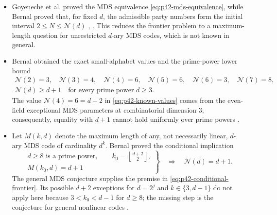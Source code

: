 \begin{itemize}
  \item Goyeneche et al. proved the MDS equivalence
  \eqref{eq:p42-mds-equivalence}, while Bernal proved that, for fixed $d$,
  the admissible party numbers form the initial interval
  $2\leq N\leq\mathcal N(d)$
  ,
  .  This reduces the frontier problem to a
  maximum-length question for unrestricted $d$-ary MDS codes, which is not
  known in general.

  \item Bernal obtained the exact small-alphabet values and the prime-power
  lower bound
  \begin{equation}
    \begin{gathered}
      \mathcal N(2)=3,\quad \mathcal N(3)=4,\quad \mathcal N(4)=6,
      \quad \mathcal N(5)=6,\quad \mathcal N(6)=3,\quad \mathcal N(7)=8,\\
      \mathcal N(d)\geq d+1
      \quad\text{for every prime power }d\geq3.
    \end{gathered}
    \label{eq:p42-known-values}
  \end{equation}
  The value $\mathcal N(4)=6=d+2$ in \eqref{eq:p42-known-values} comes from
  the even-field exceptional MDS parameters at combinatorial dimension $3$;
  consequently, equality with $d+1$ cannot hold uniformly over prime powers
  .

  \item Let $M(k,d)$ denote the maximum length of any, not necessarily
  linear, $d$-ary MDS code of cardinality $d^k$.  Bernal proved the
  conditional implication
  \begin{equation}
    \left.
    \begin{gathered}
      d\geq8\text{ is a prime power},\qquad
      k_0=\left\lfloor\frac{d+2}{2}\right\rfloor,\\
      M(k_0,d)=d+1
    \end{gathered}
    \right\}
    \quad\Longrightarrow\quad
    \mathcal N(d)=d+1.
    \label{eq:p42-conditional-frontier}
  \end{equation}
  The general MDS conjecture supplies the premise in
  \eqref{eq:p42-conditional-frontier}.  Its possible $d+2$ exceptions for
  $d=2^j$ and $k\in\{3,d-1\}$ do not apply here because
  $3<k_0<d-1$ for $d\geq8$; the missing step is the conjecture for general
  nonlinear codes
  .
\end{itemize}

